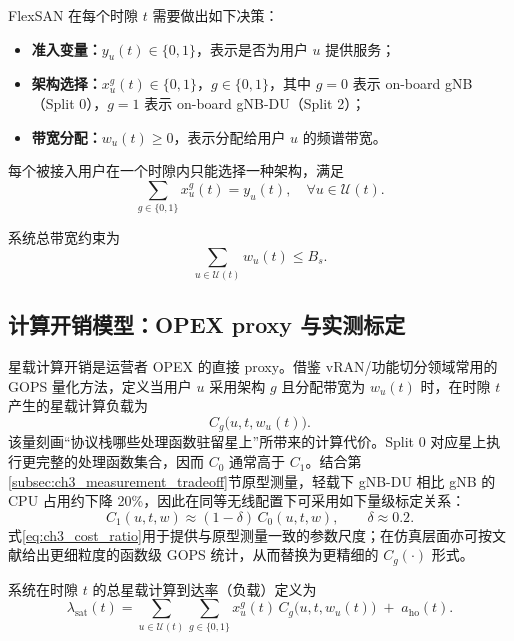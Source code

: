 \documentclass[type=master]{fduthesis}
\begin{document}
FlexSAN 在每个时隙 $t$ 需要做出如下决策：
\begin{itemize}
  \item \textbf{准入变量：}$y_u(t)\in\{0,1\}$，表示是否为用户 $u$ 提供服务；
  \item \textbf{架构选择：}$x_u^g(t)\in\{0,1\}$，$g\in\{0,1\}$，其中 $g=0$ 表示 on-board gNB（Split 0），$g=1$ 表示 on-board gNB-DU（Split 2）；
  \item \textbf{带宽分配：}$w_u(t)\ge 0$，表示分配给用户 $u$ 的频谱带宽。
\end{itemize}
每个被接入用户在一个时隙内只能选择一种架构，满足
\begin{equation}
\sum_{g\in\{0,1\}}x_u^g(t)=y_u(t),\quad \forall u\in\mathcal{U}(t).
\label{eq:ch3_assoc}
\end{equation}

系统总带宽约束为
\begin{equation}
\sum_{u\in\mathcal{U}(t)} w_u(t)\le B_s.
\label{eq:ch3_bw}
\end{equation}

\subsection{计算开销模型：OPEX proxy 与实测标定}
\label{subsec:ch3_compute_cost}

星载计算开销是运营者 OPEX 的直接 proxy。借鉴 vRAN/功能切分领域常用的 GOPS 量化方法\cite{6771075,9107209}，定义当用户 $u$ 采用架构 $g$ 且分配带宽为 $w_u(t)$ 时，在时隙 $t$ 产生的星载计算负载为
\begin{equation}
C_g\big(u,t,w_u(t)\big).
\label{eq:ch3_Cg_def}
\end{equation}
该量刻画“协议栈哪些处理函数驻留星上”所带来的计算代价。Split 0 对应星上执行更完整的处理函数集合，因而 $C_0$ 通常高于 $C_1$。结合第\ref{subsec:ch3_measurement_tradeoff}节原型测量，轻载下 gNB-DU 相比 gNB 的 CPU 占用约下降 20\%，因此在同等无线配置下可采用如下量级标定关系：
\begin{equation}
C_1(u,t,w)\approx (1-\delta)\,C_0(u,t,w),\qquad \delta\approx 0.2.
\label{eq:ch3_cost_ratio}
\end{equation}
式\eqref{eq:ch3_cost_ratio}用于提供与原型测量一致的参数尺度；在仿真层面亦可按文献\cite{6771075,9107209}给出更细粒度的函数级 GOPS 统计，从而替换为更精细的 $C_g(\cdot)$ 形式。

系统在时隙 $t$ 的总星载计算到达率（负载）定义为
\begin{equation}
\lambda_{\mathrm{sat}}(t)
=
\sum_{u\in\mathcal{U}(t)}\sum_{g\in\{0,1\}}x_u^g(t)\,C_g\big(u,t,w_u(t)\big)
\;+\;a_{\mathrm{ho}}(t).
\label{eq:ch3_lambda}
\end{equation}
\end{document}
